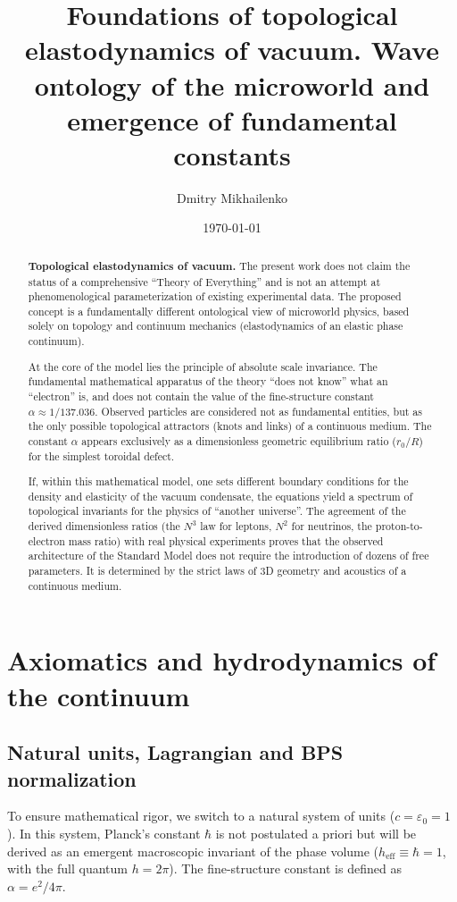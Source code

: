 \documentclass[11pt,a4paper]{article}
\title{\textbf{Foundations of topological elastodynamics of vacuum. Wave ontology of the microworld and emergence of fundamental constants}}
\author{Dmitry Mikhailenko}
\date{\today}
\begin{document}
	
\maketitle

\begin{abstract}
\textbf{Topological elastodynamics of vacuum.} 
The present work does not claim the status of a comprehensive ``Theory of Everything'' and is not an attempt at phenomeno\-logical parameterization of existing experimental data. The proposed concept is a fundamentally different ontological view of microworld physics, based solely on topology and continuum mechanics (elastodynamics of an elastic phase continuum).

At the core of the model lies the principle of absolute scale invariance. The funda\-mental mathematical apparatus of the theory ``does not know'' what an ``electron'' is, and does not contain the value of the fine-structure constant $\alpha \approx 1/137.036$. Observed particles are considered not as fundamental entities, but as the only possible topological attractors (knots and links) of a continuous medium. The constant $\alpha$ appears exclusively as a dimensionless geometric equilibrium ratio ($r_0/R$) for the simplest toroidal defect. 

If, within this mathematical model, one sets different boundary conditions for the density and elasticity of the vacuum condensate, the equations yield a spectrum of topological invariants for the physics of ``another universe''. The agreement of the derived dimensionless ratios (the $N^3$ law for leptons, $N^2$ for neutrinos, the proton-to-electron mass ratio) with real physical experiments proves that the observed architecture of the Standard Model does not require the introduction of dozens of free parameters. It is determined by the strict laws of 3D geometry and acoustics of a continuous medium.
\end{abstract}

\section{Axiomatics and hydrodynamics of the continuum}

\subsection{Natural units, Lagrangian and BPS normalization}
To ensure mathematical rigor, we switch to a natural system of units ($c = \varepsilon_0 = 1$). In this system, Planck's constant $\hbar$ is not postulated a priori but will be derived as an emergent macroscopic invariant of the phase volume ($h_{\text{eff}} \equiv \hbar = 1$, with the full quantum $h = 2\pi$). The fine-structure constant is defined as $\alpha = e^2 / 4\pi$.
\end{document}
